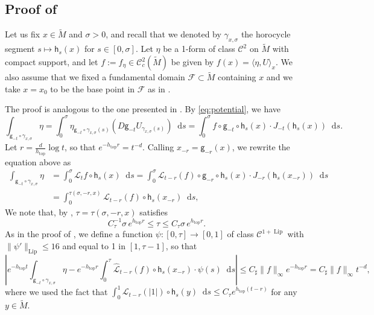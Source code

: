 \documentclass[11pt,letterpaper]{amsart}
\newcommand \cF {{\mathcal F}}
\newcommand \cL {{\mathcal L}}
\newcommand \tM {{\widetilde M}}
\newcommand \sC {{C_\sharp}}
\newcommand{\horo}{\mathsf{h}}
\newcommand{\geo}{\mathsf{g}}
\newcommand*{\diff}{\mathop{}\!\mathrm{d}}
\DeclareMathOperator{\topp}{top}
\DeclareMathOperator{\Lip}{Lip}
\theoremstyle{definition}
\begin{document}



\subsection{Proof of }\label{sec:proof_main_result_2}

Let us fix $x \in \tM$ and $\sigma >0$, and recall that we denoted by $\gamma_{x, \sigma}$ the horocycle segment $s \mapsto \horo_s(x)$ for $s \in [0,\sigma]$. Let $\eta$ be a 1-form of class $\mathscr{C}^2$ on $\tM$ with compact support, and let  $f:= f_\eta \in \mathscr{C}^{2}_c(\tM)$ be given by $f(x) = \langle \eta, U \rangle_x $. We also assume that we fixed a fundamental domain $\cF \subset \tM$ containing $x$ and we take $x=x_0$ to be the base point in $\cF$ as in .

The proof is analogous to the one presented in . 
By \eqref{eq:potential}, we have
\[
\int_{\geo_{-t} \circ \gamma_{x, \sigma}} \eta = \int_0^{\sigma} \eta_{\geo_{-t} \circ \gamma_{x, \sigma}(s)} \left( D\geo_{-t} U_{\gamma_{x, \sigma}(s)} \right) \diff s = \int_0^{\sigma} f \circ \geo_{-t} \circ \horo_s(x) \cdot J_{-t}(\horo_s(x)) \diff s.
\]
Let 
$r = \frac{d}{h_{\topp}} \log t$, so that $e^{-h_{\topp} r} = t^{-d}$.
Calling $x_{-r} = \geo_{-r}(x)$, we rewrite the equation above as 
\[
\begin{split}
\int_{\geo_{-t} \circ \gamma_{x, \sigma}} \eta &= \int_0^{\sigma} \cL_{t} f \circ \horo_s(x) \diff s= \int_0^{\sigma} \cL_{t-r}( f) \circ \geo_{-r} \circ \horo_s(x) \cdot J_{-r}(\horo_s(x_{-r})) \diff s \\
&= \int_0^{\tau(\sigma,-r,x)} \cL_{t-r}(f) \circ \horo_s(x_{-r}) \diff s,
\end{split}
\]
We note that, by , $\tau = \tau(\sigma,-r,x)$ satisfies 
\[
C_{\tau}^{-1} \sigma \, e^{h_{\topp} r} \leq \tau \leq C_{\tau} \sigma \,  e^{h_{\topp} r}.
\]
As in the proof of , we define a function $\psi \colon [0, \tau] \to [0,1]$ of class $\mathscr{C}^{1+\Lip}$ with $\|\psi'\|_{\Lip} \leq 16$ and equal to 1 in $[1, \tau-1]$, so that 
\[
\left\lvert e^{-h_{\topp} t}\int_{\geo_{-t} \circ \gamma_{x, \sigma}} \eta - e^{-h_{\topp} r}\int_0^{\tau} \hat{\cL}_{t-r}(f) \circ \horo_s(x_{-r}) \cdot \psi(s) \diff s \right\rvert \leq \sC \|f\|_{\infty} e^{-h_{\topp} r} = \sC \|f\|_{\infty} t^{-d},
\]
where we used the fact that $\int_0^1 \cL_{t-r}(|1|) \circ \horo_s(y) \diff s \leq C_{\tau} e^{h_{\topp} (t-r)}$ for any $y\in \tM$.
\end{document}

